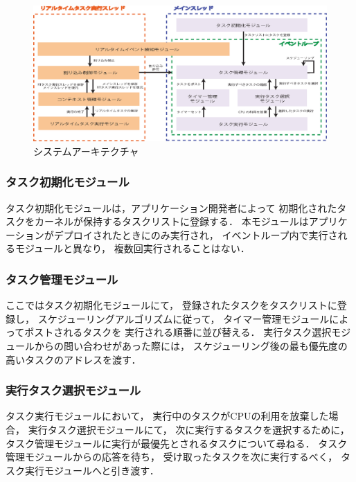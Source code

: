\begin{figure}[htbp]
 \begin{center}
  \includegraphics[width=150mm]{./images/system_architecture.eps}
 \end{center}
 \caption{システムアーキテクチャ}
 \label{fig:system_architecture}
\end{figure}


\subsubsection{タスク初期化モジュール}

\vspace{0.5em}タスク初期化モジュールは，アプリケーション開発者によって
初期化されたタスクをカーネルが保持するタスクリストに登録する．
本モジュールはアプリケーションがデプロイされたときにのみ実行され，
イベントループ内で実行されるモジュールと異なり，
複数回実行されることはない．



\subsubsection{タスク管理モジュール}

\vspace{0.5em}ここではタスク初期化モジュールにて，
登録されたタスクをタスクリストに登録し，
スケジューリングアルゴリズムに従って，
タイマー管理モジュールによってポストされるタスクを
実行される順番に並び替える．
実行タスク選択モジュールからの問い合わせがあった際には，
スケジューリング後の最も優先度の高いタスクのアドレスを渡す．



\subsubsection{実行タスク選択モジュール}

\vspace{0.5em}タスク実行モジュールにおいて，
実行中のタスクがCPUの利用を放棄した場合，
実行タスク選択モジュールにて，
次に実行するタスクを選択するために，
タスク管理モジュールに実行が最優先とされるタスクについて尋ねる．
タスク管理モジュールからの応答を待ち，
受け取ったタスクを次に実行するべく，
タスク実行モジュールへと引き渡す．



